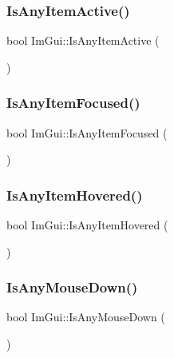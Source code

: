 \subsubsection{\texorpdfstring{Is\+Any\+Item\+Active()}{IsAnyItemActive()}}
{\footnotesize\ttfamily bool Im\+Gui\+::\+Is\+Any\+Item\+Active (\begin{DoxyParamCaption}{ }\end{DoxyParamCaption})}

\mbox{\label{namespaceImGui_a89514ca4c0a2b883c878736d92352656}} 
\subsubsection{\texorpdfstring{Is\+Any\+Item\+Focused()}{IsAnyItemFocused()}}
{\footnotesize\ttfamily bool Im\+Gui\+::\+Is\+Any\+Item\+Focused (\begin{DoxyParamCaption}{ }\end{DoxyParamCaption})}

\mbox{\label{namespaceImGui_a0512146617bb55e24ebcfbe3ce6553d5}} 
\subsubsection{\texorpdfstring{Is\+Any\+Item\+Hovered()}{IsAnyItemHovered()}}
{\footnotesize\ttfamily bool Im\+Gui\+::\+Is\+Any\+Item\+Hovered (\begin{DoxyParamCaption}{ }\end{DoxyParamCaption})}

\mbox{\label{namespaceImGui_a0ce3f28b6b09f031e12e7a81708c043a}} 
\subsubsection{\texorpdfstring{Is\+Any\+Mouse\+Down()}{IsAnyMouseDown()}}
{\footnotesize\ttfamily bool Im\+Gui\+::\+Is\+Any\+Mouse\+Down (\begin{DoxyParamCaption}{ }\end{DoxyParamCaption})}

